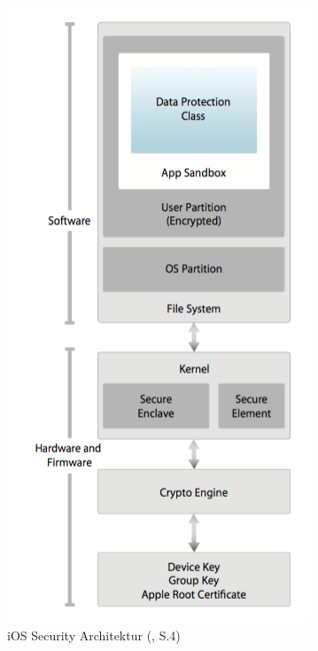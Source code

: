 \begin{figure}[htb]
\begin{minipage}{0.4\textwidth}
		\includegraphics[width=\textwidth]{Bilder/Chapter3_SecArchitektur}
		\caption {iOS Security Architektur (\cite{Apple[4]}, S.4)}
        \label{fig:iOS Security Architektur}
	\end{minipage}
\end{figure}
		    	
